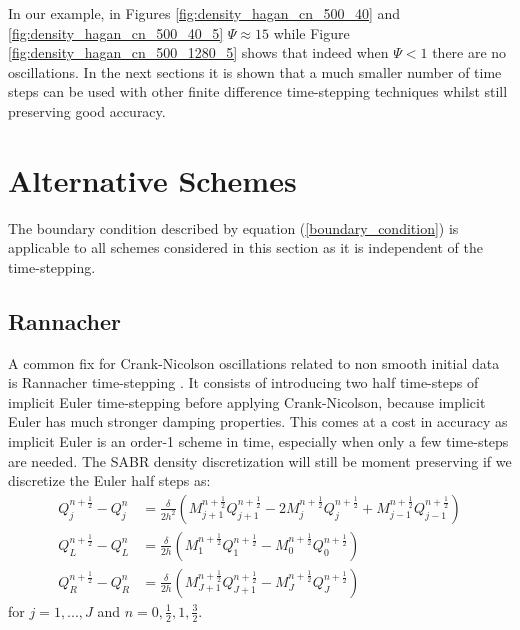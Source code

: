 \documentclass[]{rAMF2e}
\begin{document}
In our example, in Figures \ref{fig:density_hagan_cn_500_40} and \ref{fig:density_hagan_cn_500_40_5} $\Psi \approx 15$ while Figure \ref{fig:density_hagan_cn_500_1280_5} shows that indeed when $\Psi < 1$ there are no oscillations. In the next sections it is shown that a much smaller number of time steps can be used with other finite difference time-stepping techniques whilst still preserving good accuracy.

\section{Alternative Schemes}
The boundary condition described by equation (\ref{boundary_condition}) is applicable to all schemes considered in this section as it is independent of the time-stepping.

\subsection{Rannacher}
A common fix for Crank-Nicolson oscillations related to non smooth initial data is Rannacher time-stepping \citep{rannacher1984finite, GiCa2006}. It consists of introducing two half time-steps of implicit Euler time-stepping before applying Crank-Nicolson, because implicit Euler has much stronger damping properties. This comes at a cost in accuracy as implicit Euler is an order-1 scheme in time, especially when only a few time-steps are needed. 
The SABR density discretization will still be moment preserving if we discretize the Euler half steps as:
\begin{align}\label{eqn_euler_1}
Q_j^{n+\frac{1}{2}}-Q_j^n &= \frac{\delta}{2h^2} \left(M_{j+1}^{n+\frac{1}{2}}Q_{j+1}^{n+\frac{1}{2}}-2M_j^{n+\frac{1}{2}}Q_j^{n+\frac{1}{2}}+M_{j-1}^{n+\frac{1}{2}}Q_{j-1}^{n+\frac{1}{2}} \right) \\
\label{eqn_euler_2}
Q_L^{n+\frac{1}{2}}-Q_L^n &= \frac{\delta}{2h} \left(M_{1}^{n+\frac{1}{2}}Q_{1}^{n+\frac{1}{2}}-M_0^{n+\frac{1}{2}}Q_0^{n+\frac{1}{2}}\right) \\
Q_R^{n+\frac{1}{2}}-Q_R^n &= \frac{\delta}{2h} \left(M_{J+1}^{n+\frac{1}{2}}Q_{J+1}^{n+\frac{1}{2}}-M_J^{n+\frac{1}{2}}Q_J^{n+\frac{1}{2}}\right) 
\end{align}
for $j=1,...,J$ and $n=0,\frac{1}{2}, 1, \frac{3}{2}$.
\end{document}
